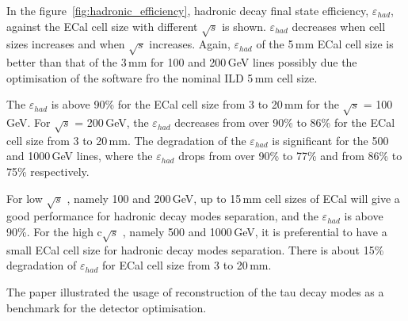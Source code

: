 \documentclass[a4paper,11pt]{article}
\newcommand{\rootS}{\ensuremath{\sqrt{s}} }
\begin{document}
In the figure~\ref{fig:hadronic_efficiency}, \PGt hadronic decay final state efficiency, $\varepsilon_{had}$, against the ECal cell size with different \rootS is shown. $\varepsilon_{had}$ decreases when cell sizes increases and when \rootS increases.  Again, $\varepsilon_{had}$ of the 5\,mm ECal cell size is better than that of the 3\,mm for 100 and 200\,GeV lines possibly due the optimisation of the software fro the nominal ILD 5\,mm cell size.

The $\varepsilon_{had}$ is above 90\% for the ECal cell size from 3 to 20\,mm for the \rootS = 100\,GeV. For \rootS = 200\,GeV, the $\varepsilon_{had}$ decreases from over 90\% to 86\% for the ECal cell size from 3 to 20\,mm. The degradation of the $\varepsilon_{had}$ is significant for the 500 and 1000\,GeV lines, where the $\varepsilon_{had}$ drops from over 90\% to 77\%  and from 86\% to 75\% respectively. 

For low \rootS, namely 100 and 200\,GeV, up to 15\,mm cell sizes of ECal will give a good performance for \PGt hadronic decay modes separation, and the $\varepsilon_{had}$ is above 90\%. For the high c\rootS, namely 500 and 1000\,GeV, it is preferential to have a small ECal cell size for \PGt hadronic decay modes separation. There is about 15\% degradation of $\varepsilon_{had}$ for ECal cell size from 3 to 20\,mm.


The paper illustrated the usage of reconstruction of the tau decay modes as a benchmark for the detector optimisation. 




\end{document}
